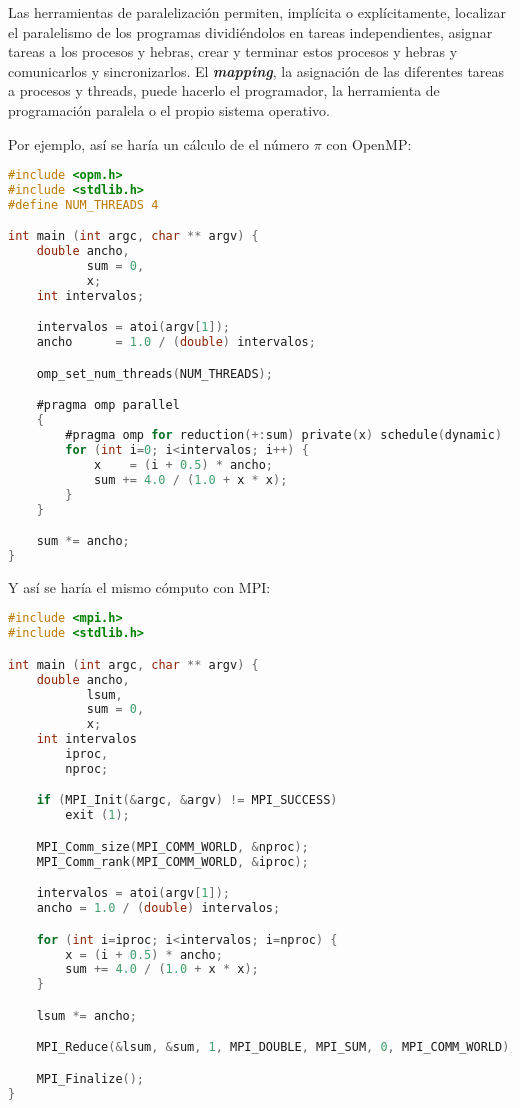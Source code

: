 Las herramientas de paralelización permiten, implícita o explícitamente, localizar el paralelismo de los programas dividiéndolos en tareas independientes, asignar tareas a los procesos y hebras, crear y terminar estos procesos y hebras y comunicarlos y sincronizarlos.
El \textbf{\textit{mapping}}, la asignación de las diferentes tareas a procesos y threads, puede hacerlo el programador, la herramienta de programación paralela o el propio sistema operativo.

\pagebreak

Por ejemplo, así se haría un cálculo de el número $\pi$ con OpenMP\@:

\begin{lstlisting}[language=C]
#include <opm.h>
#include <stdlib.h>
#define NUM_THREADS 4

int main (int argc, char ** argv) {
	double ancho,
	       sum = 0,
	       x;
	int intervalos;

	intervalos = atoi(argv[1]);
	ancho      = 1.0 / (double) intervalos;

	omp_set_num_threads(NUM_THREADS);

	#pragma omp parallel
	{
		#pragma omp for reduction(+:sum) private(x) schedule(dynamic)
		for (int i=0; i<intervalos; i++) {
			x    = (i + 0.5) * ancho;
			sum += 4.0 / (1.0 + x * x);
		}
	}

	sum *= ancho;
}
\end{lstlisting}

Y así se haría el mismo cómputo con MPI\@:

\begin{lstlisting}[language=C]
#include <mpi.h>
#include <stdlib.h>

int main (int argc, char ** argv) {
	double ancho,
	       lsum,
	       sum = 0,
	       x;
	int intervalos
	    iproc,
	    nproc;

	if (MPI_Init(&argc, &argv) != MPI_SUCCESS)
		exit (1);

	MPI_Comm_size(MPI_COMM_WORLD, &nproc);
	MPI_Comm_rank(MPI_COMM_WORLD, &iproc);

	intervalos = atoi(argv[1]);
	ancho = 1.0 / (double) intervalos;

	for (int i=iproc; i<intervalos; i=nproc) {
		x = (i + 0.5) * ancho;
		sum += 4.0 / (1.0 + x * x);
	}

	lsum *= ancho;

	MPI_Reduce(&lsum, &sum, 1, MPI_DOUBLE, MPI_SUM, 0, MPI_COMM_WORLD);

	MPI_Finalize();
}
\end{lstlisting}


